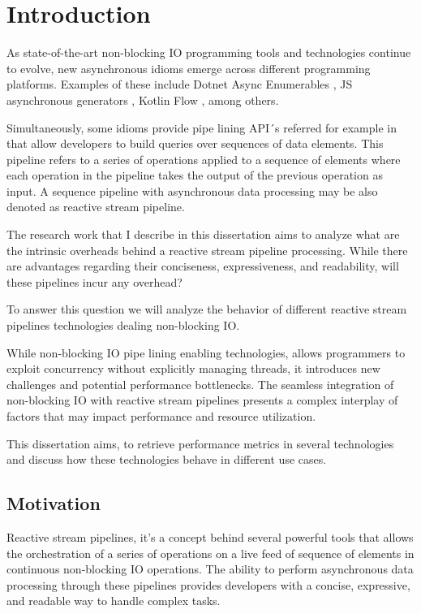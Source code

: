 % 
%  
%
\chapter{Introduction}
\label{cha:introduction}


As state-of-the-art non-blocking IO programming tools and technologies continue to evolve, new asynchronous idioms emerge across different programming platforms. Examples of these include Dotnet Async Enumerables \cite{DOTNET_ASYNC_ENUM}, JS asynchronous generators \cite{JS_ASYNC_GENERATOR}, Kotlin Flow \cite{KOTLIN_FLOW}, among others.

Simultaneously, some idioms provide pipe lining API´s referred for example in \cite{FOWLER} that allow developers to build queries over sequences of data elements. This pipeline refers to a series of operations applied to a sequence of elements where each operation in the pipeline takes the output of the previous operation as input. A sequence pipeline with asynchronous data processing may be also denoted as reactive stream pipeline.

The research work that I describe in this dissertation aims to analyze what are the intrinsic overheads behind a reactive stream pipeline processing. While there are advantages regarding their conciseness, expressiveness, and readability, will these pipelines incur any overhead?

To answer this question we will analyze the behavior of different reactive stream pipelines technologies dealing non-blocking IO.

While non-blocking IO pipe lining enabling technologies, allows programmers to exploit concurrency without explicitly managing threads, it introduces new challenges and potential performance bottlenecks. The seamless integration of non-blocking IO with reactive stream pipelines presents a complex interplay of factors that may impact performance and resource utilization. 

This dissertation aims, to retrieve performance metrics in several technologies and discuss how these technologies behave in different use cases.

\section{Motivation}
\label{sec:motivation}

Reactive stream pipelines, it's a  concept behind several powerful tools that allows the orchestration of a series of operations on a live feed of sequence of elements in continuous non-blocking IO operations. The ability to perform asynchronous data processing through these pipelines provides developers with a concise, expressive, and readable way to handle complex tasks.

